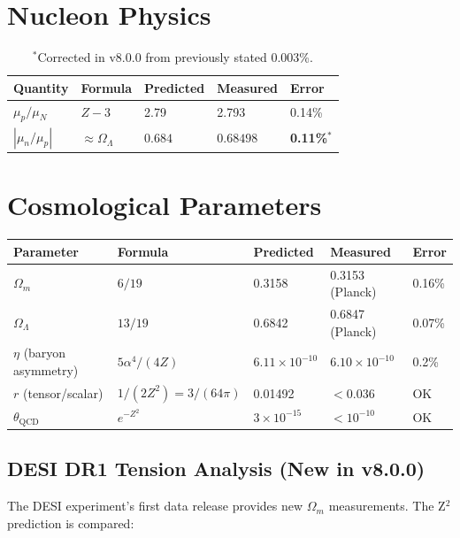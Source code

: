 \documentclass[11pt,a4paper]{article}
\theoremstyle{plain}
\theoremstyle{definition}
\theoremstyle{remark}
\newcommand{\Omegam}{\Omega_m}
\newcommand{\OmegaL}{\Omega_\Lambda}
\begin{document}
\section{Nucleon Physics}

\begin{table}[h!]
\centering
\begin{tabular}{lllll}
\toprule
\textbf{Quantity} & \textbf{Formula} & \textbf{Predicted} & \textbf{Measured} & \textbf{Error} \\
\midrule
$\mu_p/\mu_N$ & $Z - 3$ & 2.79 & 2.793 & 0.14\% \\
$|\mu_n/\mu_p|$ & $\approx\OmegaL$ & $0.684$ & $0.68498$ & \textbf{0.11\%}$^*$ \\
\bottomrule
\end{tabular}
\caption{$^*$Corrected in v8.0.0 from previously stated 0.003\%.}
\end{table}

\section{Cosmological Parameters}

\begin{table}[h!]
\centering
\begin{tabular}{lllll}
\toprule
\textbf{Parameter} & \textbf{Formula} & \textbf{Predicted} & \textbf{Measured} & \textbf{Error} \\
\midrule
$\Omegam$ & $6/19$ & 0.3158 & 0.3153 (Planck) & 0.16\% \\
$\OmegaL$ & $13/19$ & 0.6842 & 0.6847 (Planck) & 0.07\% \\
$\eta$ (baryon asymmetry) & $5\alpha^4/(4Z)$ & $6.11 \times 10^{-10}$ & $6.10 \times 10^{-10}$ & 0.2\% \\
$r$ (tensor/scalar) & $1/(2Z^2) = 3/(64\pi)$ & 0.01492 & $<0.036$ & OK \\
$\theta_{\text{QCD}}$ & $e^{-Z^2}$ & $3 \times 10^{-15}$ & $<10^{-10}$ & OK \\
\bottomrule
\end{tabular}
\end{table}

\subsection{DESI DR1 Tension Analysis (New in v8.0.0)}

The DESI experiment's first data release provides new $\Omega_m$ measurements. The Z$^2$ prediction is compared:
\end{document}
